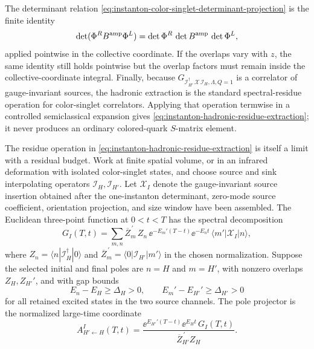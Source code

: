 The determinant relation
\eqref{eq:instanton-color-singlet-determinant-projection} is the finite
identity
\[
  \det(\Phi^R B^{\rm amp}\Phi^L)
  =
  \det\Phi^R\,\det B^{\rm amp}\,\det\Phi^L,
\]
applied pointwise in the collective coordinate.  If the overlaps vary with
\(z\), the same identity still holds pointwise but the overlap factors must
remain inside the collective-coordinate integral.  Finally, because
\(G_{\mathcal I_{H'}^\dagger\,\mathcal X\,\mathcal I_H,\Lambda,Q=1}\) is a
correlator of gauge-invariant sources, the hadronic extraction is the
standard spectral-residue operation for color-singlet correlators.  Applying
that operation termwise in a controlled semiclassical expansion gives
\eqref{eq:instanton-hadronic-residue-extraction}; it never produces an
ordinary colored-quark \(S\)-matrix element.

\begin{controlledapproximation}
\label{ca:instanton-hadronic-pole-window}
The residue operation in
\eqref{eq:instanton-hadronic-residue-extraction} is itself a limit with a
residual budget.  Work at finite spatial volume, or in an infrared
deformation with isolated color-singlet states, and choose source and sink
interpolating operators \(\mathcal I_H,\mathcal I_{H'}\).  Let
\(\mathcal X_I\) denote the gauge-invariant source insertion obtained after
the one-instanton determinant, zero-mode source coefficient, orientation
projection, and size window have been assembled.  The Euclidean three-point
function at \(0<t<T\) has the spectral decomposition
\begin{equation}
  G_I(T,t)
  =
  \sum_{m,n}
  \overline Z^{\,\prime}_{m}\,
  Z_n\,
  \ee^{-E_m'(T-t)}\ee^{-E_n t}\,
  \langle m'|\mathcal X_I|n\rangle ,
  \label{eq:instanton-hadronic-pole-window-spectral-sum}
\end{equation}
where \(Z_n=\langle n|\mathcal I_H^\dagger|0\rangle\) and
\(\overline Z_m^{\,\prime}=\langle0|\mathcal I_{H'}|m'\rangle\) in the chosen
normalization.  Suppose the selected initial and final poles are \(n=H\) and
\(m=H'\), with nonzero overlaps \(Z_H,Z_{H'}'\), and with gap bounds
\[
  E_n-E_H\ge\Delta_H>0,\qquad
  E_m'-E_{H'}'\ge\Delta_{H'}>0
\]
for all retained excited states in the two source channels.  The pole
projector is the normalized large-time coordinate
\begin{equation}
  A_{H'\leftarrow H}^{I}(T,t)
  =
  \frac{
    \ee^{E_{H'}'(T-t)}\ee^{E_Ht}\,
    G_I(T,t)
  }{
    \overline Z_{H'}^{\,\prime}Z_H
  } .
  \label{eq:instanton-hadronic-pole-window-normalized-ratio}

\end{equation}
\end{controlledapproximation}
